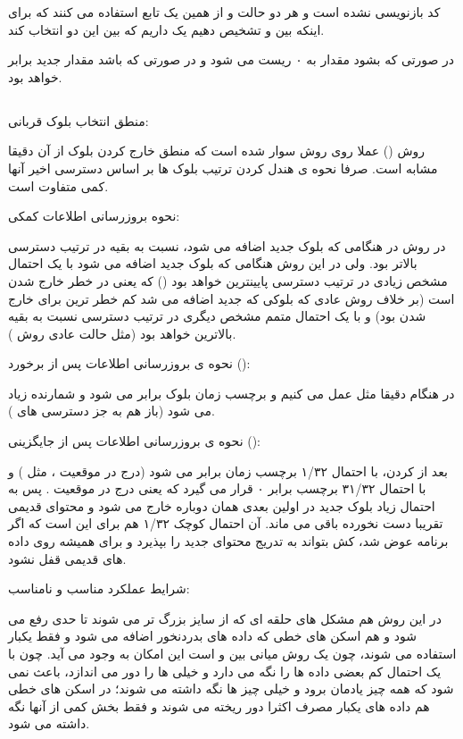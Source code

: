 \documentclass[12pt,a4paper]{article}
\begin{document}
کد  بازنویسی نشده است و هر دو حالت  و  از همین یک تابع استفاده می کنند که برای اینکه بین  و  تشخیص دهیم یک  داریم که بین این دو انتخاب کند.

در صورتی که  بشود مقدار به ۰ ریست می شود و در صورتی که  باشد مقدار جدید برابر  خواهد بود.

\subsection{}

منطق انتخاب بلوک قربانی:

روش  () عملا روی روش  سوار شده است که منطق خارج کردن بلوک از  آن دقیقا مشابه  است. صرفا نحوه ی هندل کردن ترتیب بلوک ها بر اساس دسترسی اخیر آنها کمی متفاوت است.

نحوه بروزرسانی اطلاعات کمکی:

در روش  در هنگامی که بلوک جدید اضافه می شود، نسبت به بقیه در ترتیب دسترسی بالاتر بود. ولی در این روش هنگامی که بلوک جدید اضافه می شود با یک احتمال مشخص زیادی در ترتیب دسترسی پایینترین خواهد بود () که یعنی در خطر خارج شدن است (بر خلاف روش عادی که بلوکی که جدید اضافه می شد کم خطر ترین برای خارج شدن بود) و با یک احتمال متمم مشخص دیگری در ترتیب دسترسی نسبت به بقیه بالاترین خواهد بود (مثل حالت عادی روش ).

نحوه ی بروزرسانی اطلاعات پس از برخورد ():

در هنگام  دقیقا مثل  عمل می کنیم و برچسب زمان بلوک برابر  می شود و شمارنده زیاد می شود (باز هم به جز دسترسی های ).

نحوه ی بروزرسانی اطلاعات پس از جایگزینی ():

بعد از  کردن، با احتمال ۱/۳۲ برچسب زمان برابر  می شود (درج در موقعیت ، مثل ) و با احتمال ۳۱/۳۲ برچسب برابر ۰ قرار می گیرد که یعنی درج در موقعیت . پس به احتمال زیاد بلوک جدید در اولین  بعدی همان  دوباره خارج می شود و محتوای قدیمی  تقریبا دست نخورده باقی می ماند. آن احتمال کوچک ۱/۳۲ هم برای این است که اگر  برنامه عوض شد، کش بتواند به تدریج محتوای جدید را بپذیرد و برای همیشه روی داده های قدیمی قفل نشود.

شرایط عملکرد مناسب و نامناسب:

در این روش هم مشکل  های حلقه ای که از سایز  بزرگ تر می شوند تا حدی رفع می شود و هم اسکن های خطی که داده های بدردنخور اضافه می شود و فقط یکبار استفاده می شوند، چون یک روش میانی بین  و  است این امکان به وجود می آید. چون با یک احتمال کم بعضی داده ها را نگه می دارد و خیلی ها را دور می اندازد، باعث نمی شود که همه چیز یادمان برود و خیلی چیز ها نگه داشته می شوند؛ در اسکن های خطی هم داده های یکبار مصرف اکثرا دور ریخته می شوند و فقط بخش کمی از آنها نگه داشته می شود.
\end{document}
